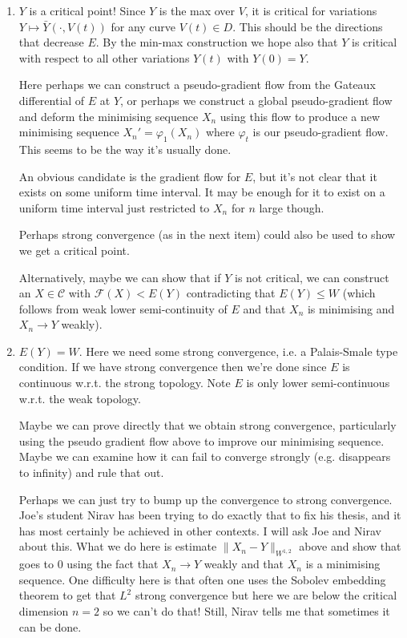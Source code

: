 \documentclass[12pt]{article}
\begin{document}
\begin{enumerate}
\item $Y$ is a critical point! Since $Y$ is the max over $V$, it is critical for variations $Y \mapsto \bar{Y}(\cdot, V(t))$ for any curve $V(t) \in D$. This should be the directions that decrease $E$. By the min-max construction we hope also that $Y$ is critical with respect to all other variations $Y(t)$ with $Y(0) = Y$.

Here perhaps we can construct a pseudo-gradient flow from the Gateaux differential of $E$ at $Y$, or perhaps we construct a global pseudo-gradient flow and deform the minimising sequence $X_n$ using this flow to produce a new minimising sequence $X_n' = \varphi_1(X_n)$ where $\varphi_t$ is our pseudo-gradient flow. This seems to be the way it's usually done.

An obvious candidate is the gradient flow for $E$, but it's not clear that it exists on some uniform time interval. It may be enough for it to exist on a uniform time interval just restricted to $X_n$ for $n$ large though.

Perhaps strong convergence (as in the next item) could also be used to show we get a critical point.

Alternatively, maybe we can show that if $Y$ is not critical, we can construct an $X \in \mathcal{C}$ with $\mathcal{F}(X) < E(Y)$ contradicting that $E(Y) \leq W$ (which follows from weak lower semi-continuity of $E$ and that $X_n$ is minimising and $X_n \to Y$ weakly).

\item $E(Y) = W$. Here we need some strong convergence, i.e. a Palais-Smale type condition. If we have strong convergence then we're done since $E$ is continuous w.r.t. the strong topology. Note $E$ is only lower semi-continuous w.r.t. the weak topology.

Maybe we can prove directly that we obtain strong convergence, particularly using the pseudo gradient flow above to improve our minimising sequence. Maybe we can examine how it can fail to converge strongly (e.g. disappears to infinity) and rule that out.

Perhaps we can just try to bump up the convergence to strong convergence. Joe's student Nirav has been trying to do exactly that to fix his thesis, and it has most certainly be achieved in other contexts. I will ask Joe and Nirav about this. What we do here is estimate $\|X_n - Y\|_{W^{1,2}}$ above and show that goes to $0$ using the fact that $X_n \to Y$ weakly and that $X_n$ is a minimising sequence. One difficulty here is that often one uses the Sobolev embedding theorem to get that $L^2$ strong convergence but here we are below the critical dimension $n = 2$ so we can't do that! Still, Nirav tells me that sometimes it can be done.


\end{enumerate}
\end{document}
